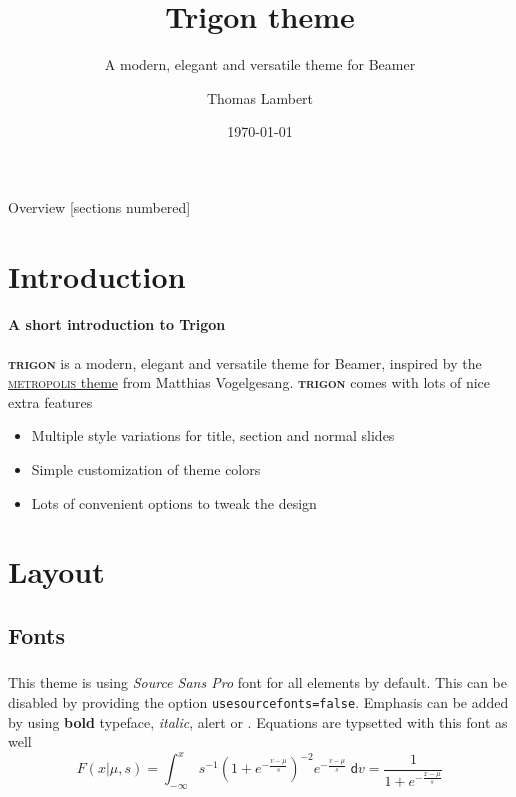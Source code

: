 \documentclass[aspectratio=169]{beamer}
\title{Trigon theme}
\subtitle{A modern, elegant and versatile theme for Beamer}
\author[TL]{Thomas Lambert}
\institute{Univeristy of Liège}
\date{\today}
\newcommand{\themename}{\textbf{\textsc{trigon}}\xspace}
\begin{document}
\titleframe

\begin{frame}{Overview}
  [sections numbered]
  \tableofcontents[hideallsubsections]
\end{frame}


\section{Introduction}
\begin{frame}{\insertsectionhead}
  \framesubtitle{A short introduction to Trigon}
  \themename is a modern, elegant and versatile theme for Beamer, inspired by
  the
  \href{https://github.com/matze/mtheme}{\textsc{metropolis} theme} from Matthias
  Vogelgesang.
  \vfill
  \themename comes with lots of nice extra features
  \begin{itemize}
    \item Multiple style variations for title, section and normal slides
    \item Simple customization of theme colors
    \item Lots of convenient options to tweak the design
  \end{itemize}
\end{frame}


\section{Layout}
\subsection{Fonts}

\begin{frame}
  \frametitle{\insertsectionhead}
  \framesubtitle{\insertsubsectionhead}
  This theme is using \textit{Source Sans Pro} font for all elements by default.
  This can be disabled by providing the option \texttt{usesourcefonts=false}.
  \vfill
  Emphasis can be added by using \textbf{bold} typeface, \textit{italic},
  \alert{alert} or {\color{tPrim}{simple colors}}.
  \vfill
  Equations are typsetted with this font as well
  \begin{equation*}
    F(x|\mu,s) = \int_{-\infty}^x s^{-1}\left(1+e^{-\frac{v-\mu}{s}}\right)^{-2} e^{-\frac{v-\mu}{s}}\;\mathsf{d}v = \frac{1}{1+e^{-\frac{x-\mu}{s}}}
  \end{equation*}
\end{frame}
\end{document}
